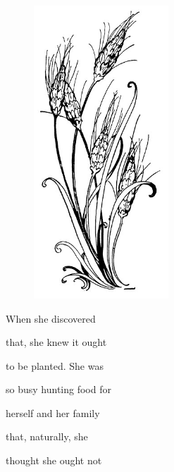 \documentclass[letterpaper, 10pt, openany]{memoir}
\begin{document}
\begin{figure}
	\vspace{-2\onelineskip}
	\includegraphics[width=0.45\textwidth]{image_011_2.jpg}
\end{figure}

\vspace{\onelineskip}

When she discovered

\vspace{\onelineskip}

that, she knew it ought

\vspace{\onelineskip}

to be planted. She was

\vspace{\onelineskip}

so busy hunting food for

\vspace{\onelineskip}

herself and her family

\vspace{\onelineskip}

that, naturally, she

\vspace{\onelineskip}

thought she ought not
\end{document}
